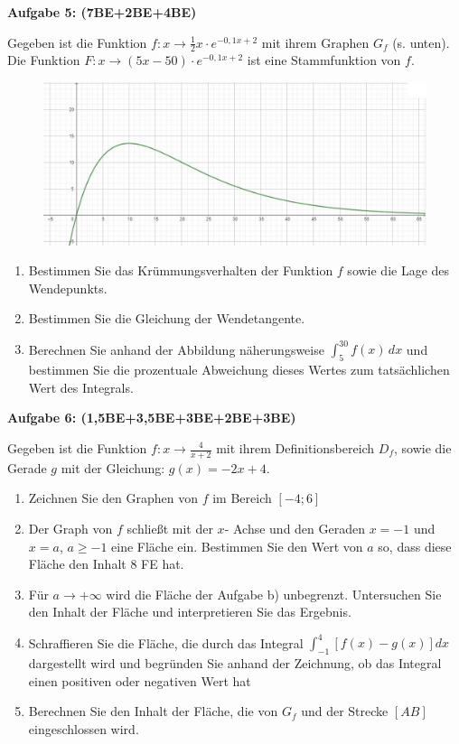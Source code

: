 \documentclass[a4paper,12pt]{article}
\newcommand{\Aufgabe}[1]{
  {
  \vspace*{0.5cm}
  \textsf{\textbf{Aufgabe #1}}
  \vspace*{0.2cm}
  
  }
}
\begin{document}
\Aufgabe{5: (7BE+2BE+4BE)}
Gegeben ist die Funktion $f: x \rightarrow \frac{1}{2} x \cdot e^{-0,1x+2}$ mit ihrem Graphen $G_f$ (s. unten).\\
Die Funktion $F: x \rightarrow (5x-50) \cdot e^{-0,1x+2}$ ist eine Stammfunktion von $f$.
  \begin{figure}[H]
    \vspace{0cm}
    \centering
    \includegraphics[width=0.8\linewidth]{Q12_SA_240103_5.jpg}
  \end{figure}

\begin{enumerate}[label={\alph*)}]
  \item Bestimmen Sie das Krümmungsverhalten der Funktion $f$ sowie die Lage des Wendepunkts.
  \item Bestimmen Sie die Gleichung der Wendetangente.
  \item Berechnen Sie anhand der Abbildung näherungsweise $\int_5^{30} f(x)\, dx$ und bestimmen Sie die prozentuale Abweichung dieses Wertes zum tatsächlichen Wert des Integrals.
\end{enumerate}

\Aufgabe{6: (1,5BE+3,5BE+3BE+2BE+3BE)}
Gegeben ist die Funktion $f: x \rightarrow \frac{4}{x+2}$ mit ihrem Definitionsbereich $D_f$, sowie die Gerade $g$ mit der Gleichung: $g(x) = -2x+4$.

\begin{enumerate}[label={\alph*)}]
  \item Zeichnen Sie den Graphen von $f$ im Bereich $[-4; 6]$
  \item Der Graph von $f$ schließt mit der $x$- Achse und den Geraden $x=-1$ und $x=a$, $a \ge -1$ eine Fläche ein. Bestimmen Sie den Wert von $a$ so, dass diese Fläche den Inhalt 8 FE hat.
  \item Für $a \rightarrow +\infty$ wird die Fläche der Aufgabe b) unbegrenzt. Untersuchen Sie den Inhalt der Fläche und interpretieren Sie das Ergebnis.
  \item Schraffieren Sie die Fläche, die durch das Integral $\int_{-1}^{4}[f(x)-g(x)] dx$ dargestellt wird und begründen Sie anhand der Zeichnung, ob das Integral einen positiven oder negativen Wert hat 

  \item Berechnen Sie den Inhalt der Fläche, die von $G_f$ und der Strecke $[A B]$ eingeschlossen wird.
\end{enumerate}
\end{document}
